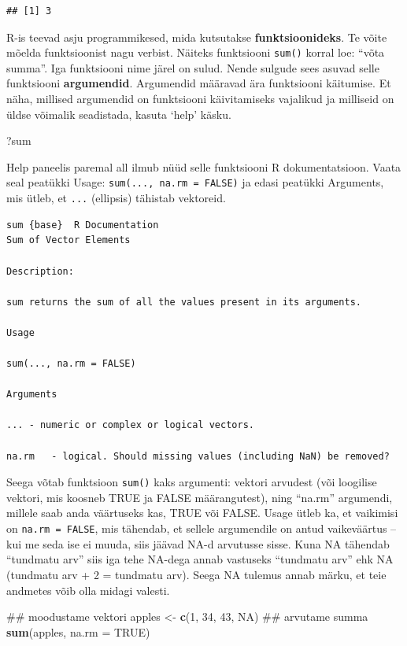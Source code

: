 \documentclass[]{book}
\newenvironment{Shaded}{\begin{snugshade}}{\end{snugshade}}
\newcommand{\KeywordTok}[1]{\textcolor[rgb]{0.13,0.29,0.53}{\textbf{#1}}}
\newcommand{\DataTypeTok}[1]{\textcolor[rgb]{0.13,0.29,0.53}{#1}}
\newcommand{\DecValTok}[1]{\textcolor[rgb]{0.00,0.00,0.81}{#1}}
\newcommand{\StringTok}[1]{\textcolor[rgb]{0.31,0.60,0.02}{#1}}
\newcommand{\OtherTok}[1]{\textcolor[rgb]{0.56,0.35,0.01}{#1}}
\newcommand{\NormalTok}[1]{#1}
\begin{document}
\begin{verbatim}
## [1] 3
\end{verbatim}

R-is teevad asju programmikesed, mida kutsutakse
\textbf{funktsioonideks}. Te võite mõelda funktsioonist nagu verbist.
Näiteks funktsiooni \texttt{sum()} korral loe: ``võta summa''. Iga
funktsiooni nime järel on sulud. Nende sulgude sees asuvad selle
funktsiooni \textbf{argumendid}. Argumendid määravad ära funktsiooni
käitumise. Et näha, millised argumendid on funktsiooni käivitamiseks
vajalikud ja milliseid on üldse võimalik seadistada, kasuta `help'
käsku.

\begin{Shaded}
\begin{Highlighting}[]
\NormalTok{?sum}
\end{Highlighting}
\end{Shaded}

Help paneelis paremal all ilmub nüüd selle funktsiooni R
dokumentatsioon. Vaata seal peatükki Usage:
\texttt{sum(...,\ na.rm\ =\ FALSE)} ja edasi peatükki Arguments, mis
ütleb, et \texttt{...} (ellipsis) tähistab vektoreid.

\begin{verbatim}
sum {base}  R Documentation 
Sum of Vector Elements

Description:

sum returns the sum of all the values present in its arguments.

Usage

sum(..., na.rm = FALSE)

Arguments

... - numeric or complex or logical vectors.

na.rm   - logical. Should missing values (including NaN) be removed?
\end{verbatim}

Seega võtab funktsioon \texttt{sum()} kaks argumenti: vektori arvudest
(või loogilise vektori, mis koosneb TRUE ja FALSE määrangutest), ning
``na.rm'' argumendi, millele saab anda väärtuseks kas, TRUE või FALSE.
Usage ütleb ka, et vaikimisi on \texttt{na.rm\ =\ FALSE}, mis tähendab,
et sellele argumendile on antud vaikeväärtus -- kui me seda ise ei
muuda, siis jäävad NA-d arvutusse sisse. Kuna NA tähendab ``tundmatu
arv'' siis iga tehe NA-dega annab vastuseks ``tundmatu arv'' ehk NA
(tundmatu arv + 2 = tundmatu arv). Seega NA tulemus annab märku, et teie
andmetes võib olla midagi valesti.

\begin{Shaded}
\begin{Highlighting}[]
\NormalTok{## moodustame vektori}
\NormalTok{apples <-}\StringTok{ }\KeywordTok{c}\NormalTok{(}\DecValTok{1}\NormalTok{, }\DecValTok{34}\NormalTok{, }\DecValTok{43}\NormalTok{, }\OtherTok{NA}\NormalTok{)}
\NormalTok{## arvutame summa}
\KeywordTok{sum}\NormalTok{(apples, }\DataTypeTok{na.rm =} \OtherTok{TRUE}\NormalTok{)}
\end{Highlighting}
\end{Shaded}
\end{document}
